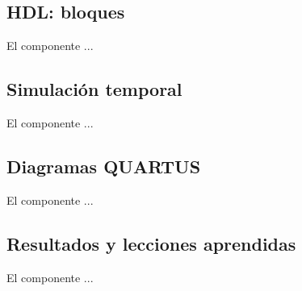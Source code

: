 \subsection{HDL: bloques}
\scriptsize

\normalsize

	El componente ...
\subsection{Simulación temporal}
\scriptsize

\normalsize

	El componente ...
\subsection{Diagramas QUARTUS}
\scriptsize

\normalsize

	El componente ...
\subsection{Resultados y lecciones aprendidas}
\scriptsize

\normalsize

	El componente ...
